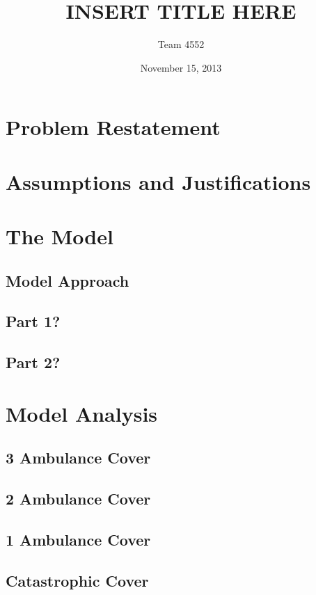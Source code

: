 \documentclass[notitlepage, 12pt]{article}
\title{\textbf{INSERT TITLE HERE}}
\author{Team 4552}
\date{November 15, 2013}
\begin{document}
\maketitle

\tableofcontents

\section{Problem Restatement}

\section{Assumptions and Justifications}

\section{The Model}

\subsection{Model Approach}

\subsection{Part 1?}

\subsection{Part 2?}

\section{Model Analysis}

\subsection{3 Ambulance Cover}

\subsection{2 Ambulance Cover}

\subsection{1 Ambulance Cover}

\subsection{Catastrophic Cover}
\end{document}

